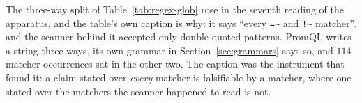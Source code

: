 \begin{remark}\label{rem:string-forms}
The three-way split of Table~\ref{tab:regex-glob} rose in the seventh reading of the
apparatus, and the table's own caption is why: it says ``every
\texttt{=\textasciitilde{}} and \texttt{!\textasciitilde{}} matcher'', and the scanner
behind it accepted only double-quoted patterns. PromQL writes a string three ways, its
own grammar in Section~\ref{sec:grammars} says so, and $114$ matcher occurrences sat in
the other two. The caption was the instrument that found it: a claim stated over
\emph{every} matcher is falsifiable by a matcher, where one stated over the matchers the
scanner happened to read is not.
\end{remark}
